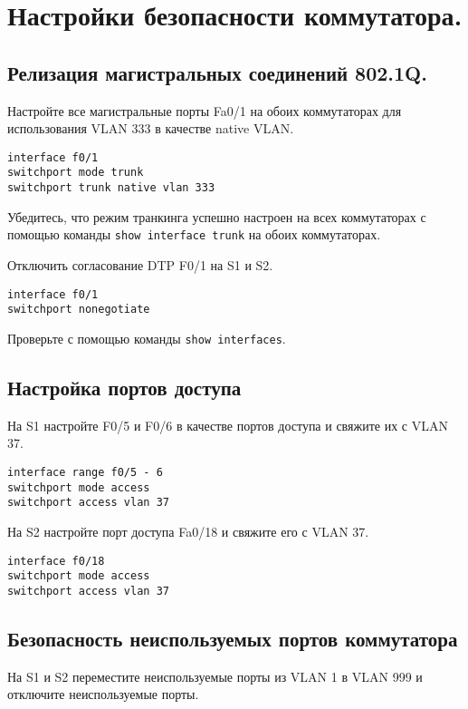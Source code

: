 \section{Настройки безопасности коммутатора.}

\subsection{Релизация магистральных соединений 802.1Q.}

Настройте все магистральные порты Fa0/1 на обоих коммутаторах
для использования VLAN 333 в качестве native VLAN.

\begin{verbatim}
interface f0/1
switchport mode trunk
switchport trunk native vlan 333
\end{verbatim}

Убедитесь, что режим транкинга успешно настроен на всех коммутаторах
с помощью команды \texttt{show interface trunk} на обоих коммутаторах.

Отключить согласование DTP F0/1 на S1 и S2.

\begin{verbatim}
interface f0/1
switchport nonegotiate
\end{verbatim}

Проверьте с помощью команды \texttt{show interfaces}.

\subsection{Настройка портов доступа}

На S1 настройте F0/5 и F0/6 в качестве портов доступа и свяжите их с VLAN 37.

\begin{verbatim}
interface range f0/5 - 6
switchport mode access
switchport access vlan 37
\end{verbatim}

На S2 настройте порт доступа Fa0/18 и свяжите его с VLAN 37.

\begin{verbatim}
interface f0/18
switchport mode access
switchport access vlan 37
\end{verbatim}

\subsection{Безопасность неиспользуемых портов коммутатора}

На S1 и S2 переместите неиспользуемые порты из VLAN 1 в VLAN 999
и отключите неиспользуемые порты.

